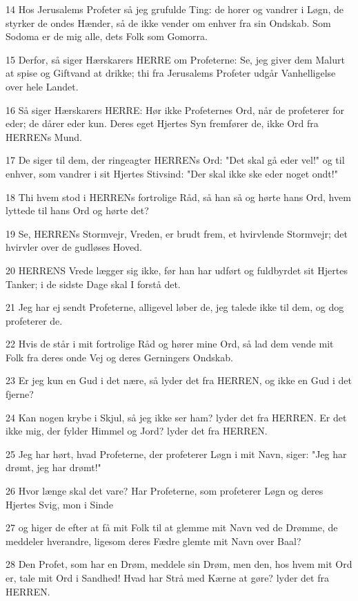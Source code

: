 \par 14 Hos Jerusalems Profeter så jeg grufulde Ting: de horer og vandrer i Løgn, de styrker de ondes Hænder, så de ikke vender om enhver fra sin Ondskab. Som Sodoma er de mig alle, dets Folk som Gomorra.
\par 15 Derfor, så siger Hærskarers HERRE om Profeterne: Se, jeg giver dem Malurt at spise og Giftvand at drikke; thi fra Jerusalems Profeter udgår Vanhelligelse over hele Landet.
\par 16 Så siger Hærskarers HERRE: Hør ikke Profeternes Ord, når de profeterer for eder; de dårer eder kun. Deres eget Hjertes Syn fremfører de, ikke Ord fra HERRENs Mund.
\par 17 De siger til dem, der ringeagter HERRENs Ord: "Det skal gå eder vel!" og til enhver, som vandrer i sit Hjertes Stivsind: "Der skal ikke ske eder noget ondt!"
\par 18 Thi hvem stod i HERRENs fortrolige Råd, så han så og hørte hans Ord, hvem lyttede til hans Ord og hørte det?
\par 19 Se, HERRENs Stormvejr, Vreden, er brudt frem, et hvirvlende Stormvejr; det hvirvler over de gudløses Hoved.
\par 20 HERRENS Vrede lægger sig ikke, før han har udført og fuldbyrdet sit Hjertes Tanker; i de sidste Dage skal I forstå det.
\par 21 Jeg har ej sendt Profeterne, alligevel løber de, jeg talede ikke til dem, og dog profeterer de.
\par 22 Hvis de står i mit fortrolige Råd og hører mine Ord, så lad dem vende mit Folk fra deres onde Vej og deres Gerningers Ondskab.
\par 23 Er jeg kun en Gud i det nære, så lyder det fra HERREN, og ikke en Gud i det fjerne?
\par 24 Kan nogen krybe i Skjul, så jeg ikke ser ham? lyder det fra HERREN. Er det ikke mig, der fylder Himmel og Jord? lyder det fra HERREN.
\par 25 Jeg har hørt, hvad Profeterne, der profeterer Løgn i mit Navn, siger: "Jeg har drømt, jeg har drømt!"
\par 26 Hvor længe skal det vare? Har Profeterne, som profeterer Løgn og deres Hjertes Svig, mon i Sinde
\par 27 og higer de efter at få mit Folk til at glemme mit Navn ved de Drømme, de meddeler hverandre, ligesom deres Fædre glemte mit Navn over Baal?
\par 28 Den Profet, som har en Drøm, meddele sin Drøm, men den, hos hvem mit Ord er, tale mit Ord i Sandhed! Hvad har Strå med Kærne at gøre? lyder det fra HERREN.
